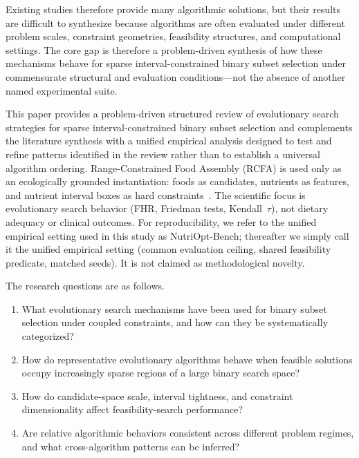 \documentclass[lettersize,journal]{IEEEtran}
\begin{document}
Existing studies therefore provide many algorithmic solutions, but their results are difficult to synthesize because algorithms are often evaluated under different problem scales, constraint geometries, feasibility structures, and computational settings.
The core gap is therefore a problem-driven synthesis of how these mechanisms behave for sparse interval-constrained binary subset selection under commensurate structural and evaluation conditions---not the absence of another named experimental suite.

This paper provides a problem-driven structured review of evolutionary search strategies for sparse interval-constrained binary subset selection and complements the literature synthesis with a unified empirical analysis designed to test and refine patterns identified in the review rather than to establish a universal algorithm ordering.
Range-Constrained Food Assembly (RCFA) is used only as an ecologically grounded instantiation: foods as candidates, nutrients as features, and nutrient interval boxes as hard constraints~\cite{stigler1945,smith1959,gaal2005,seljak2009,vassanyi2006,zhao2025acmodiet,zhao2026dmp4p}.
The scientific focus is evolutionary search behavior (FHR, Friedman tests, Kendall~$\tau$), not dietary adequacy or clinical outcomes.
For reproducibility, we refer to the unified empirical setting used in this study as NutriOpt-Bench; thereafter we simply call it the unified empirical setting (common evaluation ceiling, shared feasibility predicate, matched seeds). It is not claimed as methodological novelty.

The research questions are as follows.
\begin{enumerate}
\item[\textbf{RQ1}] What evolutionary search mechanisms have been used for binary subset selection under coupled constraints, and how can they be systematically categorized?
\item[\textbf{RQ2}] How do representative evolutionary algorithms behave when feasible solutions occupy increasingly sparse regions of a large binary search space?
\item[\textbf{RQ3}] How do candidate-space scale, interval tightness, and constraint dimensionality affect feasibility-search performance?
\item[\textbf{RQ4}] Are relative algorithmic behaviors consistent across different problem regimes, and what cross-algorithm patterns can be inferred?
\end{enumerate}
\end{document}
